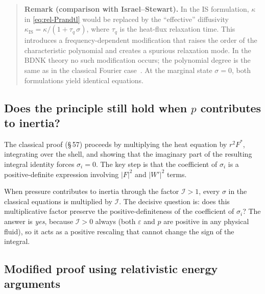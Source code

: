 \begin{quote}
\textbf{Remark (comparison with Israel--Stewart).}
In the IS formulation, $\kappa$ in \eqref{eq:rel-Prandtl} would be
replaced by the ``effective'' diffusivity
$\kappa_{\mathrm{IS}} = \kappa/(1 + \tau_{q}\,\sigma)$, where
$\tau_{q}$ is the heat-flux relaxation time.  This introduces a
frequency-dependent modification that raises the order of the
characteristic polynomial and creates a spurious relaxation mode.
In the BDNK theory no such modification occurs; the polynomial degree
is the same as in the classical Fourier
case~\cite{Kovtun2019,HoultKovtun2020}.  At the marginal state
$\sigma = 0$, both formulations yield identical equations.
\end{quote}

\subsection{Does the principle still hold when $p$ contributes to
inertia?}
\label{sec:rel-57-question}

The classical proof (\S\,57) proceeds by multiplying the heat equation
by $r^{2}F^{*}$, integrating over the shell, and showing that the
imaginary part of the resulting integral identity forces
$\sigma_{i} = 0$.  The key step is that the coefficient of $\sigma_{i}$
is a positive-definite expression involving $|F|^{2}$ and $|W'|^{2}$
terms.

When pressure contributes to inertia through the factor
$\mathcal{I} > 1$, every $\sigma$ in the classical equations is
multiplied by $\mathcal{I}$.  The decisive question is: does this
multiplicative factor preserve the positive-definiteness of the
coefficient of $\sigma_{i}$?  The answer is \emph{yes}, because
$\mathcal{I} > 0$ always (both $\varepsilon$ and $p$ are positive in
any physical fluid), so it acts as a positive rescaling that cannot
change the sign of the integral.

\subsection{Modified proof using relativistic energy arguments}
\label{sec:rel-57-proof}

